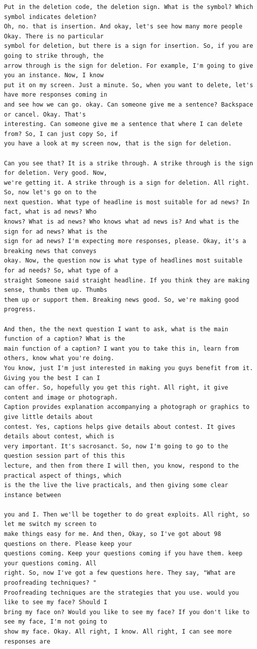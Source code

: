 {\begin{Verbatim}
Put in the deletion code, the deletion sign. What is the symbol? Which symbol indicates deletion?
Oh, no. that is insertion. And okay, let's see how many more people Okay. There is no particular
symbol for deletion, but there is a sign for insertion. So, if you are going to strike through, the
arrow through is the sign for deletion. For example, I'm going to give you an instance. Now, I know
put it on my screen. Just a minute. So, when you want to delete, let's have more responses coming in
and see how we can go. okay. Can someone give me a sentence? Backspace or cancel. Okay. That's
interesting. Can someone give me a sentence that where I can delete from? So, I can just copy So, if
you have a look at my screen now, that is the sign for deletion.

Can you see that? It is a strike through. A strike through is the sign for deletion. Very good. Now,
we're getting it. A strike through is a sign for deletion. All right. So, now let's go on to the
next question. What type of headline is most suitable for ad news? In fact, what is ad news? Who
knows? What is ad news? Who knows what ad news is? And what is the sign for ad news? What is the
sign for ad news? I'm expecting more responses, please. Okay, it's a breaking news that conveys
okay. Now, the question now is what type of headlines most suitable for ad needs? So, what type of a
straight Someone said straight headline. If you think they are making sense, thumbs them up. Thumbs
them up or support them. Breaking news good. So, we're making good progress.

And then, the the next question I want to ask, what is the main function of a caption? What is the
main function of a caption? I want you to take this in, learn from others, know what you're doing.
You know, just I'm just interested in making you guys benefit from it. Giving you the best I can I
can offer. So, hopefully you get this right. All right, it give content and image or photograph.
Caption provides explanation accompanying a photograph or graphics to give little details about
contest. Yes, captions helps give details about contest. It gives details about contest, which is
very important. It's sacrosanct. So, now I'm going to go to the question session part of this this
lecture, and then from there I will then, you know, respond to the practical aspect of things, which
is the the live the live practicals, and then giving some clear instance between

you and I. Then we'll be together to do great exploits. All right, so let me switch my screen to
make things easy for me. And then, Okay, so I've got about 98 questions on there. Please keep your
questions coming. Keep your questions coming if you have them. keep your questions coming. All
right. So, now I've got a few questions here. They say, "What are proofreading techniques? "
Proofreading techniques are the strategies that you use. would you like to see my face? Should I
bring my face on? Would you like to see my face? If you don't like to see my face, I'm not going to
show my face. Okay. All right, I know. All right, I can see more responses are


\end{Verbatim}}
